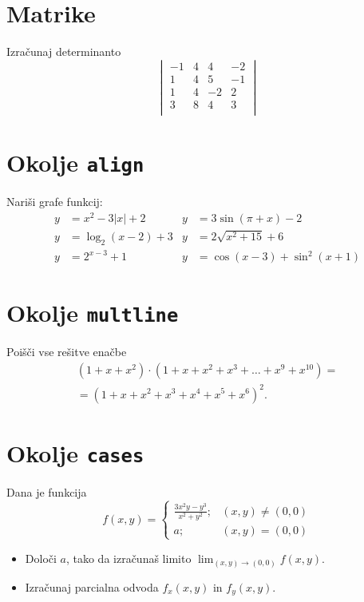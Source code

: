 \documentclass[a4paper,12pt]{article}
\begin{document}
\section*{Matrike}
Izračunaj determinanto
\[\begin{vmatrix}
    -1 & 4 & 4 & -2 \\
    1 & 4 & 5 & -1 \\
    1 & 4 & -2 & 2 \\
    3 & 8 & 4 & 3 \\
\end{vmatrix}\]

\section*{Okolje \texttt{align}}
Nariši grafe funkcij:
\begin{align}
	 y &= x^2 - 3|x| + 2    &y &= 3 \sin(\pi+x) - 2 \\
    y &= \log_2(x-2) + 3   &y &= 2 \sqrt{x^2+15} + 6 \\
    y &= 2^{x-3} + 1       &y &= \cos(x-3) + \sin^2(x+1)
\end{align}


\section*{Okolje \texttt{multline}}
Poišči vse rešitve enačbe
\begin{multline}
(1+x+x^2) \cdot (1+x+x^2+x^3+\ldots+x^9+x^{10}) = \\
 =(1+x+x^2+x^3+x^4+x^5+x^6)^2.
\end{multline}

\section*{Okolje \texttt{cases}}
Dana je funkcija
\[
f(x,y) =
\begin{cases}
    \frac{3x^2y-y^3}{x^2+y^2}; &(x,y)\neq(0,0) \\
     a; &(x,y) = (0,0)    
\end{cases}
\]

\begin{itemize}
\item Določi \(a\), tako da izračunaš limito \( \lim_{(x,y)\to(0,0)} f(x,y) \).
\item Izračunaj parcialna odvoda \(f_x(x,y)\) in \(f_y(x,y)\).
\end{itemize}
\end{document}

